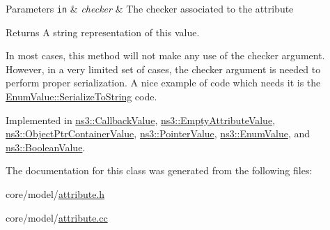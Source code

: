 \begin{DoxyParams}[1]{Parameters}
\mbox{\tt in}  & {\em checker} & The checker associated to the attribute \\
\hline
\end{DoxyParams}
\begin{DoxyReturn}{Returns}
A string representation of this value.
\end{DoxyReturn}
In most cases, this method will not make any use of the checker argument. However, in a very limited set of cases, the checker argument is needed to perform proper serialization. A nice example of code which needs it is the \hyperlink{classns3_1_1EnumValue_a753378a21c9c99f5700833c21be399ff}{Enum\+Value\+::\+Serialize\+To\+String} code. 

Implemented in \hyperlink{classns3_1_1CallbackValue_a516e948ae9c0850a5c3319a497b06170}{ns3\+::\+Callback\+Value}, \hyperlink{classns3_1_1EmptyAttributeValue_a6102940d7bd133e41cdcfb51e4b24bed}{ns3\+::\+Empty\+Attribute\+Value}, \hyperlink{classns3_1_1ObjectPtrContainerValue_a2909bb8cabd86eb28a8c6a3336906864}{ns3\+::\+Object\+Ptr\+Container\+Value}, \hyperlink{classns3_1_1PointerValue_a1b2cca223a38e146dff8299a3ca157c9}{ns3\+::\+Pointer\+Value}, \hyperlink{classns3_1_1EnumValue_a753378a21c9c99f5700833c21be399ff}{ns3\+::\+Enum\+Value}, and \hyperlink{classns3_1_1BooleanValue_a3de1dce9fe51590d1802b6b8c2897933}{ns3\+::\+Boolean\+Value}.



The documentation for this class was generated from the following files\+:\begin{DoxyCompactItemize}
\item 
core/model/\hyperlink{attribute_8h}{attribute.\+h}\item 
core/model/\hyperlink{attribute_8cc}{attribute.\+cc}\end{DoxyCompactItemize}
